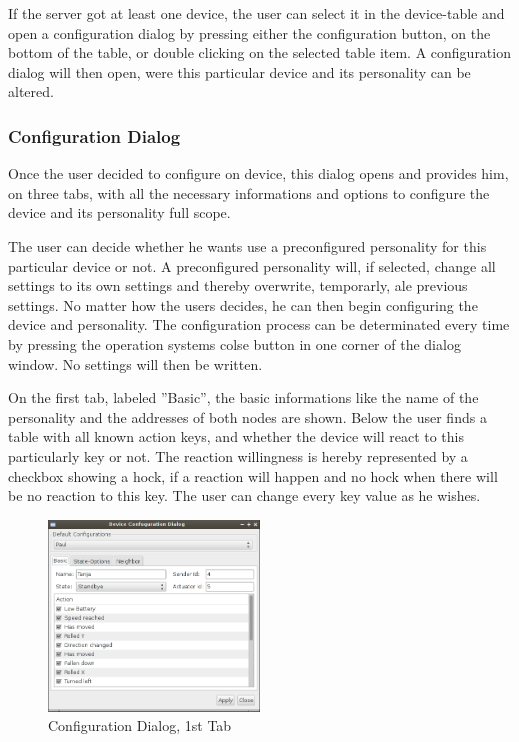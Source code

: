 If the server got at least one device, the user can select it in the device-table and open a configuration dialog by pressing either the configuration button, on the bottom of the table, or double clicking on the selected table item. A configuration dialog will then open, were this particular device and its personality can be altered.

\subsubsection{Configuration Dialog}
Once the user decided to configure on device, this dialog opens and provides him, on three tabs, with all the necessary informations and options to configure the device and its personality full scope. %

The user can decide whether he wants use a preconfigured personality for this particular device or not. A preconfigured personality will, if selected, change all settings to its own settings and thereby overwrite, temporarly, ale previous settings. No matter how the users decides, he can then begin configuring the device and personality. The configuration process can be determinated every time by pressing the operation systems colse button in one corner of the dialog window. No settings will then be written.

On the first tab, labeled ''Basic'', the basic informations like the name of the personality and the addresses of both nodes are shown. Below the user finds a table with all known action keys, and whether the device will react to this particularly key or not. The reaction willingness is hereby represented by a checkbox showing a hock, if a reaction will happen and no hock when there will be no reaction to this key. The user can change every key value as he wishes.

\begin{figure}[h!]
 \centering
 \includegraphics[width= 0.5\textwidth, clip=true  ,keepaspectratio=true]{./pic/java-server-config01.png}
 \caption{Configuration Dialog, 1st Tab}
 \label{fig:java-server-config01}
\end{figure}

